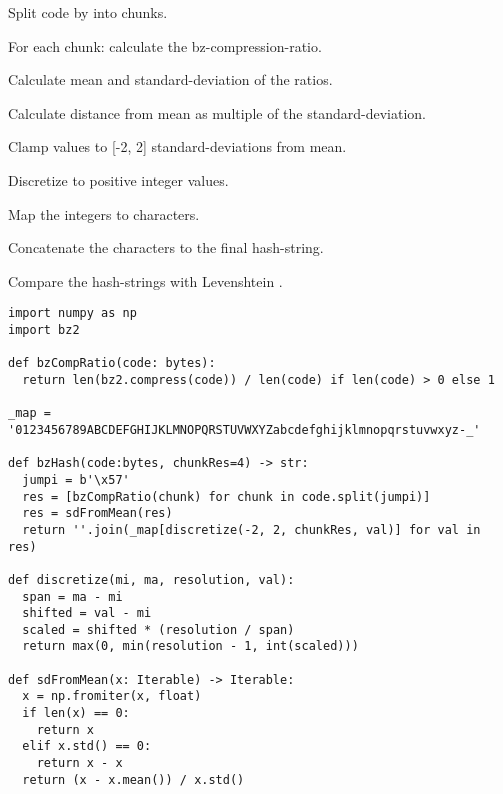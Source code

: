 \documentclass[../main.tex]{subfiles}
\begin{document}
\begin{ol}
  \item Split code by  into chunks.
  \item For each chunk: calculate the bz-compression-ratio.
  \item Calculate mean and standard-deviation of the ratios.
  \item Calculate distance from mean as multiple of the standard-deviation.
  \item Clamp values to [-2, 2] standard-deviations from mean.
  \item Discretize to positive integer values.
  \item Map the integers to characters.
  \item Concatenate the characters to the final hash-string.
  \item Compare the hash-strings with Levenshtein .
\end{ol}

\begin{lstlisting}[style=pymd]
import numpy as np
import bz2

def bzCompRatio(code: bytes):
  return len(bz2.compress(code)) / len(code) if len(code) > 0 else 1

_map = '0123456789ABCDEFGHIJKLMNOPQRSTUVWXYZabcdefghijklmnopqrstuvwxyz-_'

def bzHash(code:bytes, chunkRes=4) -> str:
  jumpi = b'\x57'
  res = [bzCompRatio(chunk) for chunk in code.split(jumpi)]
  res = sdFromMean(res)
  return ''.join(_map[discretize(-2, 2, chunkRes, val)] for val in res)

def discretize(mi, ma, resolution, val):
  span = ma - mi
  shifted = val - mi
  scaled = shifted * (resolution / span)
  return max(0, min(resolution - 1, int(scaled)))

def sdFromMean(x: Iterable) -> Iterable:
  x = np.fromiter(x, float)
  if len(x) == 0:
    return x
  elif x.std() == 0:
    return x - x
  return (x - x.mean()) / x.std()
\end{lstlisting}
\end{document}
